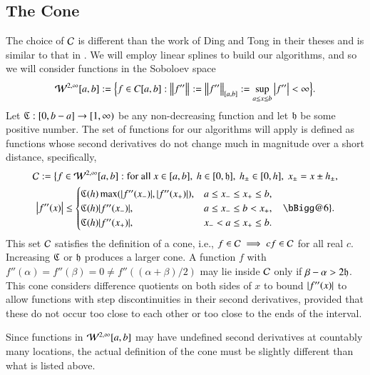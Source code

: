 \documentclass[review]{elsarticle}
\makeatletter
\newcommand{\Vast}{\bBigg@{6}}
\newcommand{\Vastr}{\mathclose\Vast}
\makeatother
\begin{document}
\subsection{The Cone}
The choice of $\cc$ is different than the work of Ding and Tong in their theses and is similar to that in \cite{HicRazYun15a}. We will employ linear splines to build our algorithms, and so we will consider functions in the Soboloev space
\[
\cw^{2,\infty}[a,b] : = \Bigl \{f \in C[a,b] : \norm{f''} : = \norm[{[a,b]}]{f''} : = \sup_{a \le x \le b} \abs{f''} <  \infty \Bigr\}.
\]
Let $\fC : [0,b-a] \to [1,\infty)$ be any non-decreasing function and let $\fh$ be some positive number.  The set of functions for our algorithms will apply is defined as functions whose second derivatives do not change much in magnitude over a short distance, specifically,
\begin{multline} \label{condef}
\cc : = \bigl \{ f \in \cw^{2,\infty}[a,b] : \text{for all }x \in [a,b], \ h \in [0, \fh], \ h_{\pm} \in [0,h], \ x_\pm = x \pm h_\pm, \\  \abs{f''(x)}
\le \begin{cases} \fC(h) \max(|f''(x_-)|, |f''(x_+)|), & a \le x_- \le x_+ \le b,\\
\fC(h) |f''(x_-)|, & a \le x_- \le b <  x_+, \\
\fC(h) |f''(x_+)|, & x_- < a \le x_+ \le b.
\end{cases} \quad 
 \Vastr \}.
\end{multline}
This set $\cc$ satisfies the definition of a cone, i.e., $f \in \cc \implies cf \in \cc$ for all real $c$.  Increasing $\fC$ or $\fh$ produces a larger cone.  A function $f$ with $f''(\alpha) = f''(\beta) = 0 \ne f''((\alpha+\beta)/2)$  may lie inside $\cc$ only if $\beta - \alpha > 2\fh$.  This cone considers difference quotients on both sides of $x$ to bound $\abs{f''(x)}$ to allow functions with step discontinuities in their second derivatives, provided that these do not occur too close to each other or too close to the ends of the interval.

Since functions in $\cw^{2,\infty}[a,b]$ may have undefined second derivatives at countably many locations, the actual definition of the cone must be slightly different than what is listed above.
\end{document}

